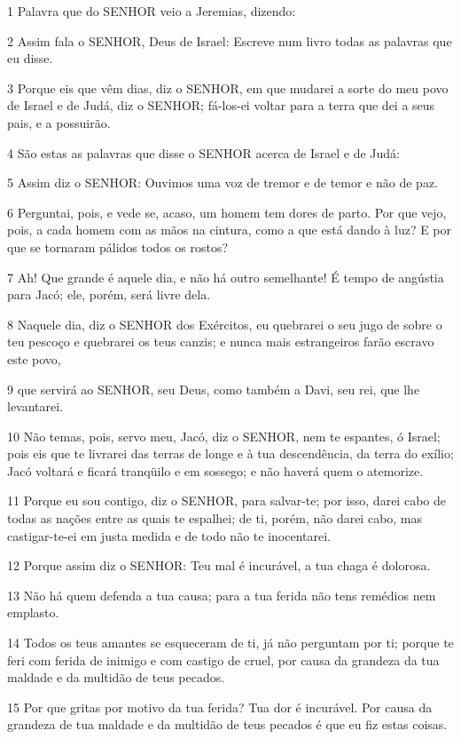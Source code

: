 \par 1 Palavra que do SENHOR veio a Jeremias, dizendo:
\par 2 Assim fala o SENHOR, Deus de Israel: Escreve num livro todas as palavras que eu disse.
\par 3 Porque eis que vêm dias, diz o SENHOR, em que mudarei a sorte do meu povo de Israel e de Judá, diz o SENHOR; fá-los-ei voltar para a terra que dei a seus pais, e a possuirão.
\par 4 São estas as palavras que disse o SENHOR acerca de Israel e de Judá:
\par 5 Assim diz o SENHOR: Ouvimos uma voz de tremor e de temor e não de paz.
\par 6 Perguntai, pois, e vede se, acaso, um homem tem dores de parto. Por que vejo, pois, a cada homem com as mãos na cintura, como a que está dando à luz? E por que se tornaram pálidos todos os rostos?
\par 7 Ah! Que grande é aquele dia, e não há outro semelhante! É tempo de angústia para Jacó; ele, porém, será livre dela.
\par 8 Naquele dia, diz o SENHOR dos Exércitos, eu quebrarei o seu jugo de sobre o teu pescoço e quebrarei os teus canzis; e nunca mais estrangeiros farão escravo este povo,
\par 9 que servirá ao SENHOR, seu Deus, como também a Davi, seu rei, que lhe levantarei.
\par 10 Não temas, pois, servo meu, Jacó, diz o SENHOR, nem te espantes, ó Israel; pois eis que te livrarei das terras de longe e à tua descendência, da terra do exílio; Jacó voltará e ficará tranqüilo e em sossego; e não haverá quem o atemorize.
\par 11 Porque eu sou contigo, diz o SENHOR, para salvar-te; por isso, darei cabo de todas as nações entre as quais te espalhei; de ti, porém, não darei cabo, mas castigar-te-ei em justa medida e de todo não te inocentarei.
\par 12 Porque assim diz o SENHOR: Teu mal é incurável, a tua chaga é dolorosa.
\par 13 Não há quem defenda a tua causa; para a tua ferida não tens remédios nem emplasto.
\par 14 Todos os teus amantes se esqueceram de ti, já não perguntam por ti; porque te feri com ferida de inimigo e com castigo de cruel, por causa da grandeza da tua maldade e da multidão de teus pecados.
\par 15 Por que gritas por motivo da tua ferida? Tua dor é incurável. Por causa da grandeza de tua maldade e da multidão de teus pecados é que eu fiz estas coisas.
